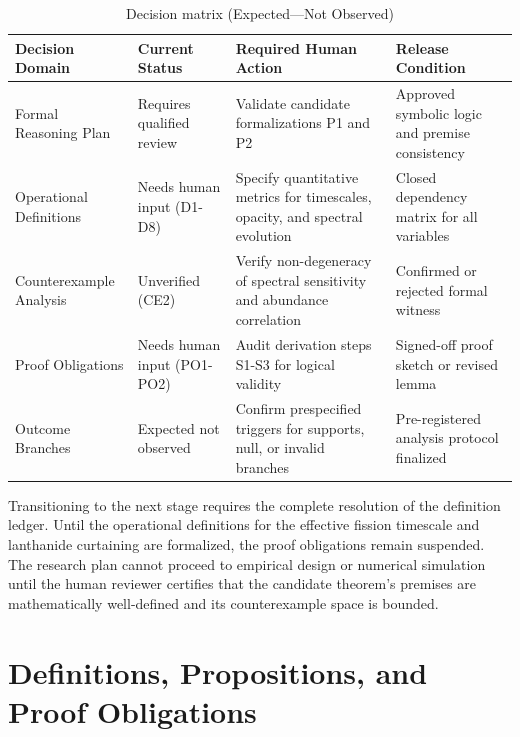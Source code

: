 \documentclass[conference]{IEEEtran}
\begin{document}
\begin{table}[htbp]
\centering
\footnotesize
\setlength{\tabcolsep}{3pt}
\renewcommand{\arraystretch}{1.12}
\caption{Decision matrix (Expected---Not Observed)}
\label{tab:risk-limitations-and-review-rlr-t1}
\begin{tabular}{|p{}|p{}|p{}|p{}|}
\hline
Decision Domain & Current Status & Required Human Action & Release Condition \\\hline
Formal Reasoning Plan & Requires qualified review & Validate candidate formalizations P1 and P2 & Approved symbolic logic and premise consistency \\\hline
Operational Definitions & Needs human input (D1-D8) & Specify quantitative metrics for timescales, opacity, and spectral evolution & Closed dependency matrix for all variables \\\hline
Counterexample Analysis & Unverified (CE2) & Verify non-degeneracy of spectral sensitivity and abundance correlation & Confirmed or rejected formal witness \\\hline
Proof Obligations & Needs human input (PO1-PO2) & Audit derivation steps S1-S3 for logical validity & Signed-off proof sketch or revised lemma \\\hline
Outcome Branches & Expected not observed & Confirm prespecified triggers for supports, null, or invalid branches & Pre-registered analysis protocol finalized \\\hline
\end{tabular}
\end{table}

Transitioning to the next stage requires the complete resolution of the definition ledger. Until the operational definitions for the effective fission timescale and lanthanide curtaining are formalized, the proof obligations remain suspended. The research plan cannot proceed to empirical design or numerical simulation until the human reviewer certifies that the candidate theorem's premises are mathematically well-defined and its counterexample space is bounded.

\section{Definitions, Propositions, and Proof Obligations}
\end{document}
